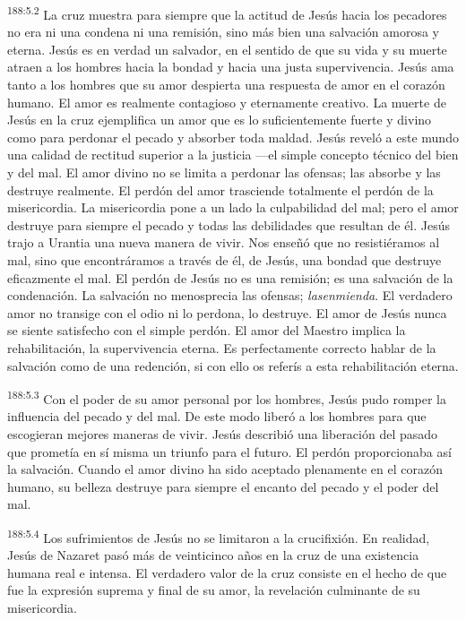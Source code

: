 \par 
\textsuperscript{188:5.2} La cruz muestra para siempre que la actitud de Jesús hacia los pecadores no era ni una condena ni una remisión, sino más bien una salvación amorosa y eterna. Jesús es en verdad un salvador, en el sentido de que su vida y su muerte atraen a los hombres hacia la bondad y hacia una justa supervivencia. Jesús ama tanto a los hombres que su amor despierta una respuesta de amor en el corazón humano. El amor es realmente contagioso y eternamente creativo. La muerte de Jesús en la cruz ejemplifica un amor que es lo suficientemente fuerte y divino como para perdonar el pecado y absorber toda maldad. Jesús reveló a este mundo una calidad de rectitud superior a la justicia ---el simple concepto técnico del bien y del mal. El amor divino no se limita a perdonar las ofensas; las absorbe y las destruye realmente. El perdón del amor trasciende totalmente el perdón de la misericordia. La misericordia pone a un lado la culpabilidad del mal; pero el amor destruye para siempre el pecado y todas las debilidades que resultan de él. Jesús trajo a Urantia una nueva manera de vivir. Nos enseñó que no resistiéramos al mal, sino que encontráramos a través de él, de Jesús, una bondad que destruye eficazmente el mal. El perdón de Jesús no es una remisión; es una salvación de la condenación. La salvación no menosprecia las ofensas; \textit{lasenmienda}. El verdadero amor no transige con el odio ni lo perdona, lo destruye. El amor de Jesús nunca se siente satisfecho con el simple perdón. El amor del Maestro implica la rehabilitación, la supervivencia eterna. Es perfectamente correcto hablar de la salvación como de una redención, si con ello os referís a esta rehabilitación eterna.

\par 
\textsuperscript{188:5.3} Con el poder de su amor personal por los hombres, Jesús pudo romper la influencia del pecado y del mal. De este modo liberó a los hombres para que escogieran mejores maneras de vivir. Jesús describió una liberación del pasado que prometía en sí misma un triunfo para el futuro. El perdón proporcionaba así la salvación. Cuando el amor divino ha sido aceptado plenamente en el corazón humano, su belleza destruye para siempre el encanto del pecado y el poder del mal.

\par 
\textsuperscript{188:5.4} Los sufrimientos de Jesús no se limitaron a la crucifixión. En realidad, Jesús de Nazaret pasó más de veinticinco años en la cruz de una existencia humana real e intensa. El verdadero valor de la cruz consiste en el hecho de que fue la expresión suprema y final de su amor, la revelación culminante de su misericordia.

